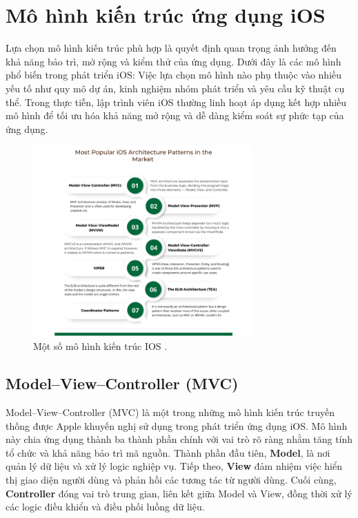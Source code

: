 \section{Mô hình kiến trúc ứng dụng iOS}
Lựa chọn mô hình kiến trúc phù hợp là quyết định quan trọng ảnh hưởng đến khả năng bảo trì, mở rộng và kiểm thử của ứng dụng. Dưới đây là các mô hình phổ biến trong phát triển iOS:
Việc lựa chọn mô hình nào phụ thuộc vào nhiều yếu tố như quy mô dự án, kinh nghiệm nhóm phát triển và yêu cầu kỹ thuật cụ thể. Trong thực tiễn, lập trình viên iOS thường linh hoạt áp dụng kết hợp nhiều mô hình để tối ưu hóa khả năng mở rộng và dễ dàng kiểm soát sự phức tạp của ứng dụng.

\begin{figure}[H] 
    \centering
    \includegraphics[width=0.75\textwidth]{images/mohinhkientrucios.png}
     \caption{Một số mô hình kiến trúc IOS \cite{MôHinhIOS}.}
    \label{fig:mohinhkientrucios}
\end{figure}
\subsection{Model–View–Controller (MVC)}
Model–View–Controller (MVC) là một trong những mô hình kiến trúc truyền thống được Apple khuyến nghị sử dụng trong phát triển ứng dụng iOS. Mô hình này chia ứng dụng thành ba thành phần chính với vai trò rõ ràng nhằm tăng tính tổ chức và khả năng bảo trì mã nguồn. Thành phần đầu tiên, \textbf{Model}, là nơi quản lý dữ liệu và xử lý logic nghiệp vụ. Tiếp theo, \textbf{View} đảm nhiệm việc hiển thị giao diện người dùng và phản hồi các tương tác từ người dùng. Cuối cùng, \textbf{Controller} đóng vai trò trung gian, liên kết giữa Model và View, đồng thời xử lý các logic điều khiển và điều phối luồng dữ liệu.

